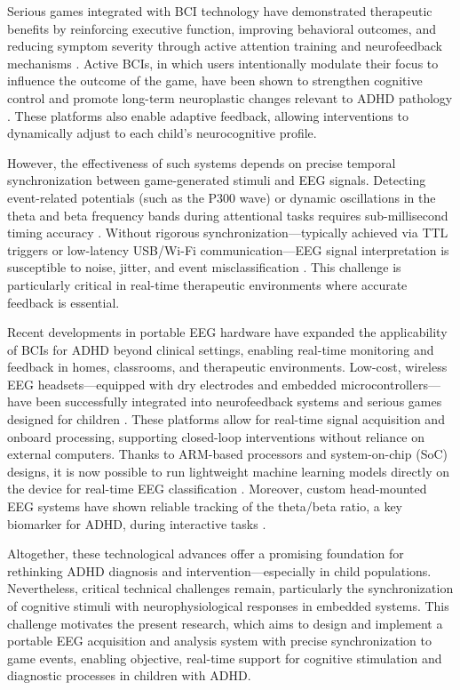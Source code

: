 Serious games integrated with BCI technology have demonstrated therapeutic benefits by reinforcing executive function, improving behavioral outcomes, and reducing symptom severity through active attention training and neurofeedback mechanisms \cite{Doulou2025}. Active BCIs, in which users intentionally modulate their focus to influence the outcome of the game, have been shown to strengthen cognitive control and promote long-term neuroplastic changes relevant to ADHD pathology \cite{Cervantes2023}. These platforms also enable adaptive feedback, allowing interventions to dynamically adjust to each child's neurocognitive profile.

However, the effectiveness of such systems depends on precise temporal synchronization between game-generated stimuli and EEG signals. Detecting event-related potentials (such as the P300 wave) or dynamic oscillations in the theta and beta frequency bands during attentional tasks requires sub-millisecond timing accuracy \cite{Wikstrom2022, Sandstrak2024}. Without rigorous synchronization—typically achieved via TTL triggers or low-latency USB/Wi-Fi communication—EEG signal interpretation is susceptible to noise, jitter, and event misclassification \cite{iwama2023two}. This challenge is particularly critical in real-time therapeutic environments where accurate feedback is essential.

Recent developments in portable EEG hardware have expanded the applicability of BCIs for ADHD beyond clinical settings, enabling real-time monitoring and feedback in homes, classrooms, and therapeutic environments. Low-cost, wireless EEG headsets—equipped with dry electrodes and embedded microcontrollers—have been successfully integrated into neurofeedback systems and serious games designed for children \cite{Xu2018}. These platforms allow for real-time signal acquisition and onboard processing, supporting closed-loop interventions without reliance on external computers. Thanks to ARM-based processors and system-on-chip (SoC) designs, it is now possible to run lightweight machine learning models directly on the device for real-time EEG classification \cite{Wang_2020}. Moreover, custom head-mounted EEG systems have shown reliable tracking of the theta/beta ratio, a key biomarker for ADHD, during interactive tasks \cite{Larocco2020}.

Altogether, these technological advances offer a promising foundation for rethinking ADHD diagnosis and intervention—especially in child populations. Nevertheless, critical technical challenges remain, particularly the synchronization of cognitive stimuli with neurophysiological responses in embedded systems. This challenge motivates the present research, which aims to design and implement a portable EEG acquisition and analysis system with precise synchronization to game events, enabling objective, real-time support for cognitive stimulation and diagnostic processes in children with ADHD.




